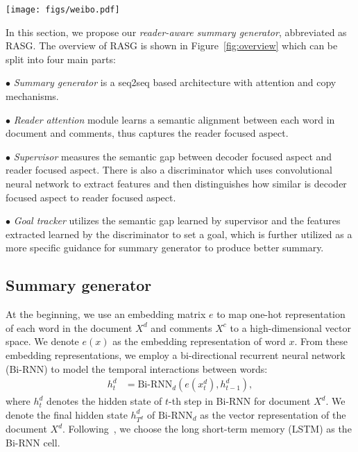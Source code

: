 \documentclass[letterpaper]{article} \usepackage{aaai19}  \usepackage{times}  \usepackage{helvet}  \usepackage{courier}
\begin{document}
\begin{figure*}
    \centering
    \texttt{[image: figs/weibo.pdf]}
    \caption{Overview of RASG. We divide our model into four parts: (1) \textit{Summary generator} generates a summary to describe the main aspect of document. (2) \textit{Reader attention} module models the readers attention of document. (3) \textit{Supervisor} models the gap of focused document aspect between generated summary and reader comments. (4) \textit{Goal tracker} sets a goal of summary generator according to gap given by supervisor. 
    }
    \label{fig:overview}
\end{figure*}

In this section, we propose our \emph{reader-aware summary generator}, abbreviated as RASG. 
The overview of RASG is shown in Figure~\ref{fig:overview} which can be split into four main parts:

$\bullet$ \textit{Summary generator} is a seq2seq based architecture with attention and copy mechanisms.

$\bullet$ \textit{Reader attention} module learns a semantic alignment between each word in document and comments, thus captures the reader focused aspect.

$\bullet$ \textit{Supervisor} measures the semantic gap between decoder focused aspect and reader focused aspect.
There is also a discriminator which uses convolutional neural network to extract features and then distinguishes how similar is decoder focused aspect to reader focused aspect.

$\bullet$ \textit{Goal tracker} utilizes the semantic gap learned by supervisor and the features extracted learned by the discriminator to set a goal, which is further utilized as a more specific guidance for summary generator to produce better summary.



\subsection{Summary generator}

At the beginning, we use an embedding matrix $e$ to map one-hot representation of each word in the document $X^d$ and comments $X^c$ to a high-dimensional vector space.
We denote $e(x)$ as the embedding representation of word $x$.
From these embedding representations, we employ a bi-directional recurrent neural network (Bi-RNN) to model the temporal interactions between words:
\begin{align}
    h^d_t &= \text{Bi-RNN}_d(e(x^d_t), h^d_{t-1}) ,
\end{align}
\noindent where $h^{d}_t$ denotes the hidden state of $t$-th step in Bi-RNN for document $X^d$. 
We denote the final hidden state $h^d_{T^d}$ of $\text{Bi-RNN}_d$ as the vector representation of the document $X^d$.
Following~\cite{see2017get,Ma2018AHE}, we choose the long short-term memory (LSTM) as the Bi-RNN cell. 
\end{document}
